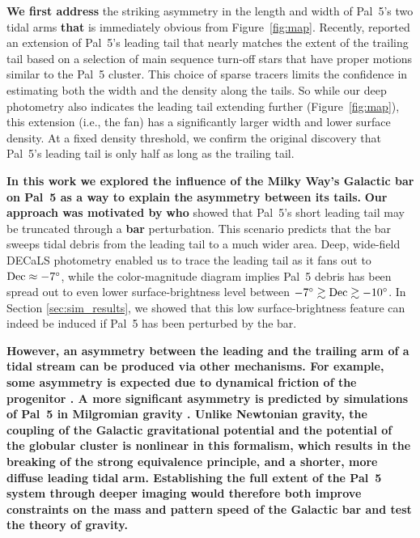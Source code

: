 \documentclass[twocolumn]{aastex62}
\newcommand{\changes}[1]{{\textbf{#1}}}
\begin{document}
\changes{We first address} the striking asymmetry in the length and width of Pal~5's two tidal arms \changes{that} is immediately obvious from Figure~\ref{fig:map}.
Recently, \citet{Starkman:2019} reported an extension of Pal~5's leading tail that nearly matches the extent of the trailing tail based on a selection of main sequence turn-off stars that have proper motions similar to the Pal~5 cluster.
This choice of sparse tracers limits the confidence in estimating both the width and the density along the tails.
So while our deep photometry also indicates the leading tail extending further (Figure~\ref{fig:map}), this extension (i.e., the fan) has a significantly larger width and lower surface density.
At a fixed density threshold, we confirm the original \citet{Bernard:2016} discovery that Pal~5's leading tail is only half as long as the trailing tail.

\changes{In this work we explored the influence of the Milky Way's Galactic bar on Pal~5 as a way to explain the asymmetry between its tails.}
\changes{Our approach was motivated by} \citet{Pearson:2017} \changes{who} showed that Pal~5's short leading tail may be truncated through a \changes{bar} perturbation.
This scenario predicts that the bar sweeps tidal debris from the leading tail to a much wider area.
Deep, wide-field DECaLS photometry enabled us to trace the leading tail as it fans out to $\rm Dec\approx-7^\circ$, while the color-magnitude diagram implies Pal~5 debris has been spread out to even lower surface-brightness level between $-7^\circ\gtrsim\rm Dec\gtrsim-10^\circ$.
In Section \ref{sec:sim_results}, we showed that this low surface-brightness feature can indeed be induced if Pal~5 has been perturbed by the bar.

\changes{
However, an asymmetry between the leading and the trailing arm of a tidal stream can be produced via other mechanisms.
For example, some asymmetry is expected due to dynamical friction of the progenitor \citep[although only $0.02^\circ$ for Pal~5,][]{Kipper:2019}.
A more significant asymmetry is predicted by simulations of Pal~5 in Milgromian gravity \citep{Thomas:2018}.
Unlike Newtonian gravity, the coupling of the Galactic gravitational potential and the potential of the globular cluster is nonlinear in this formalism, which results in the breaking of the strong equivalence principle, and a shorter, more diffuse leading tidal arm.
Establishing the full extent of the Pal~5 system through deeper imaging would therefore both improve constraints on the mass and pattern speed of the Galactic bar \citep[e.g.,][]{Clarke:2019, Sanders:2019, Bovy:2019} and test the theory of gravity.
}
\end{document}
